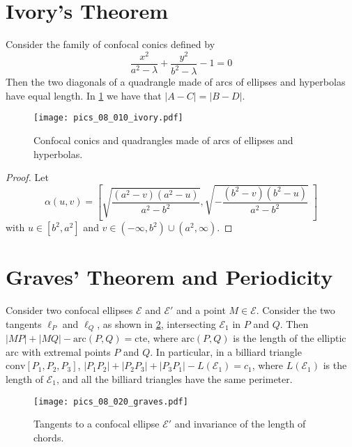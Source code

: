 \section{Ivory's Theorem}

\begin{theorem}\label{prop:ivory}
    Consider the family of confocal conics defined by
    \[\frac{x^2}{a^2-\lambda}+\frac{y^2}{b^2-\lambda}-1=0\]
    Then the two diagonals of a  quadrangle  made of arcs of ellipses and hyperbolas have equal length. In \cref{fig:ivory} we have that $|A-C|=|B-D|.$
\end{theorem}

\begin{figure}
\begin{center}
\texttt{[image: pics\_08\_010\_ivory.pdf]}
\caption{ Confocal conics and quadrangles made of arcs of ellipses and hyperbolas.}
\label{fig:ivory}
\end{center}
\end{figure}

\begin{proof} Let 
  \[ \alpha(u,v)=  \left[\sqrt {{\frac { \left( {a}^{2}-v \right)  \left( {a}^{2}-u \right) }{
{a}^{2}-{b}^{2}}}},\sqrt {-{\frac { \left( {b}^{2}-v \right)  \left( {
b}^{2}-u \right) }{{a}^{2}-{b}^{2}}}}\; \right]
\]
with $u\in [b^2,a^2]$ and $v\in (-\infty,b^2)\cup (a^2,\infty).$
\end{proof}



\section{Graves' Theorem and Periodicity}

 \begin{proposition} 
 	  \label{prop:dar1} Consider two confocal ellipses $\mathcal E$ and $\mathcal{E}'$ and a point $M\in\mathcal E$. Consider the   two tangents $\ell_P$ and $\ell_Q$,  as shown in   \cref{fig:da_cordas}, intersecting $\mathcal{E}_1$ in $P$ and $Q$. Then $|MP|+|MQ|-\text{arc}{(P,Q)}=\mathrm{cte}$, where $\text{arc}(P,Q)$ is the length of the elliptic arc with extremal points   $P$ and $Q$. In particular, in a   billiard triangle $\text{conv}[P_1,P_2,P_3]$,  $|P_1P_2|+|P_2P_3|+|P_3P_1|-L(\mathcal{E}_1  )=  c_1$, where $L(\mathcal{E}_1) $ is the length of $\mathcal{E}_1$, and all the billiard triangles have the same perimeter.
 	
 \end{proposition}
 \begin{figure}
 \begin{center}
   \texttt{[image: pics\_08\_020\_graves.pdf]}
		\caption{ Tangents to a confocal  ellipse $\mathcal{E}'$ and invariance of the length of chords.}
		\label{fig:da_cordas}
 	\end{center}
\end{figure}
 
